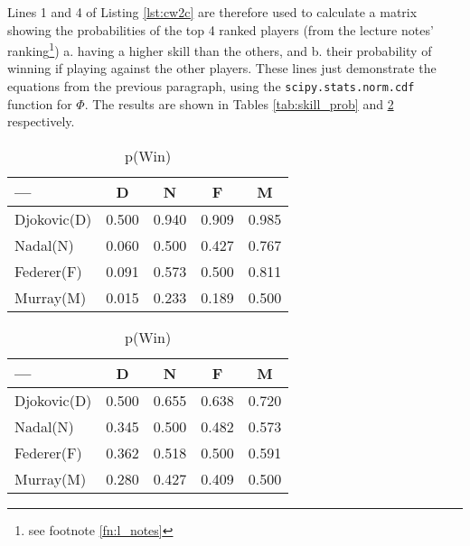 \documentclass[11pt]{amsart}
\begin{document}
Lines 1 and 4 of Listing \ref{lst:cw2c} are therefore used to calculate a matrix showing the probabilities of the top 4 ranked players (from the lecture notes' ranking\footnote{see footnote \ref{fn:l_notes}}) a. having a higher skill than the others, and b. their probability of winning if playing against the other players. These lines just demonstrate the equations from the previous paragraph, using the \verb|scipy.stats.norm.cdf| function for $\Phi$. The results are shown in Tables \ref{tab:skill_prob} and \ref{tab:win_prob} respectively.
\begin{table}
    \centering{}
    \begin{minipage}[t]{0.495\textwidth}
        \begin{center}
            \begin{tabular}{lcccc}\toprule
                ---         & D           & N           & F           & M           \\ \midrule
                Djokovic(D) & \num{0.500} & \num{0.940} & \num{0.909} & \num{0.985} \\
                Nadal(N)    & \num{0.060} & \num{0.500} & \num{0.427} & \num{0.767} \\
                Federer(F)  & \num{0.091} & \num{0.573} & \num{0.500} & \num{0.811} \\
                Murray(M)   & \num{0.015} & \num{0.233} & \num{0.189} & \num{0.500} \\  \bottomrule
            \end{tabular}%
            \par\end{center}
        \caption{p(Higher Skill)} \label{tab:skill_prob}
    \end{minipage}%
    \begin{minipage}[t]{0.495\textwidth}%
        \begin{center}
            \begin{tabular}{lcccc} \toprule
                ---         & D           & N           & F           & M           \\ \midrule
                Djokovic(D) & \num{0.500} & \num{0.655} & \num{0.638} & \num{0.720} \\
                Nadal(N)    & \num{0.345} & \num{0.500} & \num{0.482} & \num{0.573} \\
                Federer(F)  & \num{0.362} & \num{0.518} & \num{0.500} & \num{0.591} \\
                Murray(M)   & \num{0.280} & \num{0.427} & \num{0.409} & \num{0.500} \\ \bottomrule
            \end{tabular}
            \par\end{center}
        \caption{p(Win)} \label{tab:win_prob}
    \end{minipage}%
\end{table}
\end{document}
